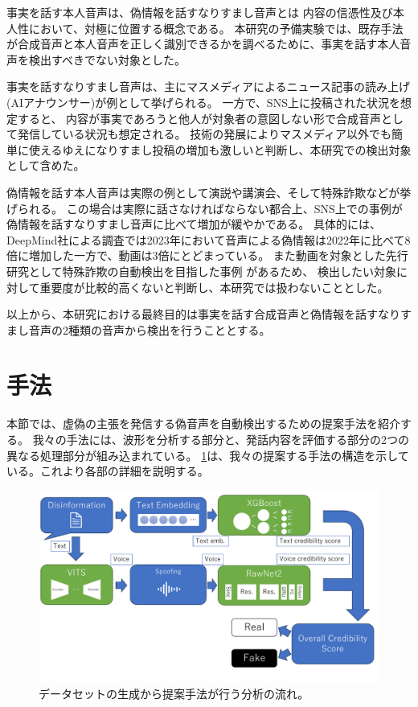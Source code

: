 事実を話す本人音声は、偽情報を話すなりすまし音声とは
内容の信憑性及び本人性において、対極に位置する概念である。
本研究の予備実験では、既存手法が合成音声と本人音声を正しく識別できるかを調べるために、事実を話す本人音声を検出すべきでない対象とした。

事実を話すなりすまし音声は、主にマスメディアによるニュース記事の読み上げ(AIアナウンサー)が例として挙げられる\cite{nhk2020,nhkAnnual2020}。
一方で、SNS上に投稿された状況を想定すると、
内容が事実であろうと他人が対象者の意図しない形で合成音声として発信している状況も想定される。
技術の発展によりマスメディア以外でも簡単に使えるゆえになりすまし投稿の増加も激しいと判断し、本研究での検出対象として含めた。

偽情報を話す本人音声は実際の例として演説や講演会、そして特殊詐欺などが挙げられる。
この場合は実際に話さなければならない都合上、SNS上での事例が偽情報を話すなりすまし音声に比べて増加が緩やかである。
具体的には、DeepMind社による調査では2023年において音声による偽情報は2022年に比べて8倍に増加した一方で、動画は3倍にとどまっている\cite{Ulmer_Tong_2023}。
また動画を対象とした先行研究として特殊詐欺の自動検出を目指した事例 \cite{近野恵2023}があるため、
検出したい対象に対して重要度が比較的高くないと判断し、本研究では扱わないこととした。

以上から、本研究における最終目的は事実を話す合成音声と偽情報を話すなりすまし音声の2種類の音声から検出を行うこととする。

\section{手法}\label{sec:cnt_mtd}
本節では、虚偽の主張を発信する偽音声を自動検出するための提案手法を紹介する。
我々の手法には、波形を分析する部分と、発話内容を評価する部分の2つの異なる処理部分が組み込まれている。
\cref{fig:structure}は、我々の提案する手法の構造を示している。これより各部の詳細を説明する。

\begin{figure}[h]
    \centering
    \includegraphics[width=\linewidth]{figures/Structure.pdf}
    \caption{データセットの生成から提案手法が行う分析の流れ。}
    \label{fig:structure}
\end{figure}

